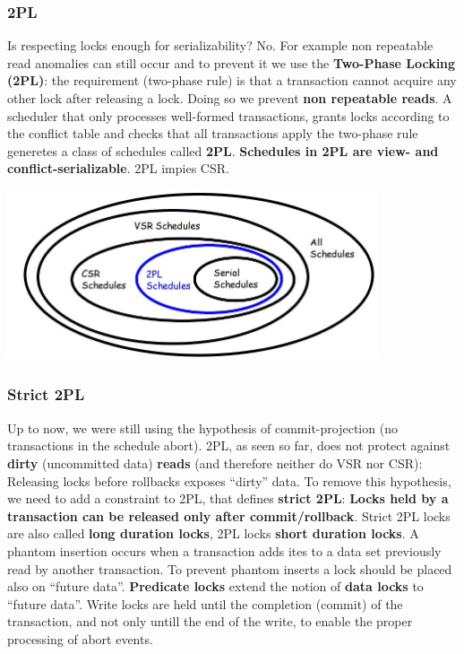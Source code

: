 \subsubsection{2PL}
Is respecting locks enough for serializability? No. For example non repeatable read anomalies can still occur and to prevent it we use the \textbf{Two-Phase Locking (2PL)}: the requirement (two-phase rule) is that a transaction cannot acquire any other lock after releasing a lock. Doing so we prevent \textbf{non repeatable reads}.\newline
\newline
A scheduler that only processes well-formed transactions, grants locks according to the conflict table and checks that all transactions apply the two-phase rule generetes a class of schedules called \textbf{2PL}.\newline
\newline
\textbf{Schedules in 2PL are view- and conflict-serializable}. 2PL impies CSR.
\begin{center}
    \includegraphics[height=5cm]{../arguments/2PL.JPG}
\end{center}
\subsubsection{Strict 2PL}
Up to now, we were still using the hypothesis of
commit-projection (no transactions in the schedule
abort).\newline
2PL, as seen so far, does not protect against \textbf{dirty} (uncommitted data) \textbf{reads} (and therefore neither do VSR nor CSR): Releasing locks before rollbacks exposes “dirty” data.\newline
\newline
To remove this hypothesis, we need to add a constraint to
2PL, that defines \textbf{strict 2PL}: \textbf{Locks held by a transaction can be released only after
commit/rollback}.\newline
\newline
Strict 2PL locks are also called \textbf{long duration locks}, 2PL locks \textbf{short duration locks}.\newline
\newline
A phantom insertion occurs when a transaction adds ites to a data set previously read by another transaction. To prevent phantom inserts a lock should be placed also on
“future data”.\newline
\newline
\textbf{Predicate locks} extend the notion of \textbf{data locks} to “future data”.\newline
\newline
Write locks are held until the completion (commit) of the transaction, and not only untill the end of the write, to enable the proper processing of abort events.

